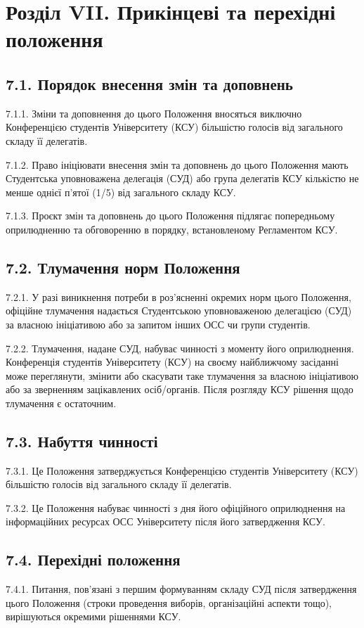 \section*{Розділ VII. Прикінцеві та перехідні положення}

\subsection*{7.1. Порядок внесення змін та доповнень}
    7.1.1. Зміни та доповнення до цього Положення вносяться виключно Конференцією студентів Університету (КСУ) більшістю голосів від загального складу її делегатів.

    7.1.2. Право ініціювати внесення змін та доповнень до цього Положення мають Студентська уповноважена делегація (СУД) або група делегатів КСУ кількістю не менше однієї п'ятої (1/5) від загального складу КСУ.

    7.1.3. Проєкт змін та доповнень до цього Положення підлягає попередньому оприлюдненню та обговоренню в порядку, встановленому Регламентом КСУ.

\subsection*{7.2. Тлумачення норм Положення}
    7.2.1. У разі виникнення потреби в роз'ясненні окремих норм цього Положення, офіційне тлумачення надається Студентською уповноваженою делегацією (СУД) за власною ініціативою або за запитом інших ОСС чи групи студентів.

    7.2.2. Тлумачення, надане СУД, набуває чинності з моменту його оприлюднення. Конференція студентів Університету (КСУ) на своєму найближчому засіданні може переглянути, змінити або скасувати таке тлумачення за власною ініціативою або за зверненням зацікавлених осіб/органів. Після розгляду КСУ рішення щодо тлумачення є остаточним.

\subsection*{7.3. Набуття чинності}
    7.3.1. Це Положення затверджується Конференцією студентів Університету (КСУ) більшістю голосів від загального складу її делегатів.

    7.3.2. Це Положення набуває чинності з дня його офіційного оприлюднення на інформаційних ресурсах ОСС Університету після його затвердження КСУ.

\subsection*{7.4. Перехідні положення}
    7.4.1. Питання, пов'язані з першим формуванням складу СУД після затвердження цього Положення (строки проведення виборів, організаційні аспекти тощо), вирішуються окремими рішеннями КСУ. 